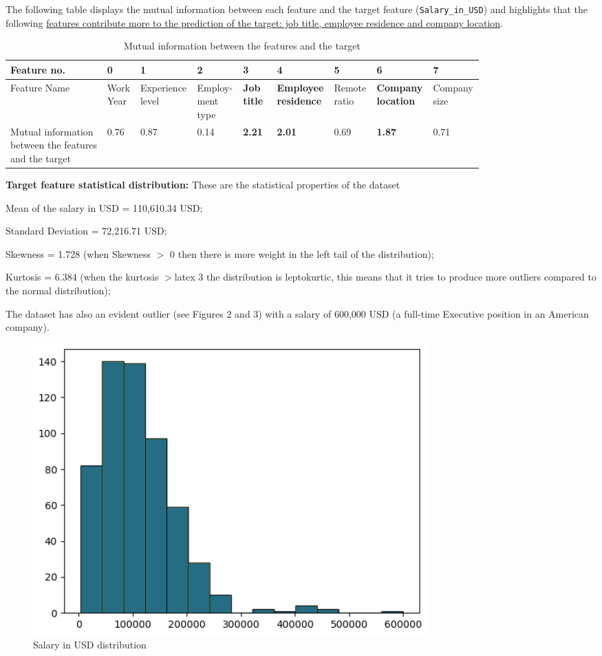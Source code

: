 \documentclass[11pt,a4paper]{article}
\newcommand{\SubItem}[1]{
  {\setlength\itemindent{13pt} \item[◦] #1}
}
\begin{document}
\begin{itemize}
The following table displays the mutual information between each feature and the target feature (\texttt{Salary\_in\_USD}) and highlights that the following \uline{features contribute more to the prediction of the target: job title, employee residence and company location}.

\begin{table}
\centering
\begin{tabular}{p{0.2\linewidth} | p{0.06\linewidth}| p{0.09\linewidth}| p{0.075\linewidth}| p{0.075\linewidth}| p{0.075\linewidth}| p{0.075\linewidth}| p{0.075\linewidth}| p{0.075\linewidth}} \hline
Feature no.&0&1&2&3&4&5&6&7\\ \hline
Feature Name&Work Year&Experience level&Employ- ment type&\textbf{Job title}&\textbf{Employee residence}&Remote ratio&\textbf{Company location}&Company size\\ \hline
Mutual information between the features and the target&0.76&0.87&0.14&\textbf{2.21}&\textbf{2.01}&0.69&\textbf{1.87}&0.71\\
\hline\end{tabular}
\caption{Mutual information between the features and the target}
\label{tab:Mutual information between the features and the target}
\end{table}

\item \textbf{Target feature statistical distribution:} These are the statistical properties of the dataset
\SubItem{Mean of the salary in USD = 110,610.34 USD;}
\SubItem{Standard Deviation = 72,216.71 USD;}
\SubItem{Skewness = 1.728 (when Skewness $>$ 0 then there is more weight in the left tail of the distribution);}
\SubItem{Kurtosis = 6.384 (when the kurtosis $>$latex  3 the distribution is leptokurtic, this means that it tries to produce more outliers compared to the normal distribution);}
\SubItem{The dataset has also an evident outlier (see Figures 2 and 3) with a salary of 600,000 USD (a full-time Executive position in an American company).}

\begin{figure}
    \centering
    \includegraphics[width=1\linewidth]{ICS-5110-Fig-02.png}
    \caption{Salary in USD distribution}
    \label{fig:Salary in USD distribution}
\end{figure}


\end{itemize}
\end{document}
